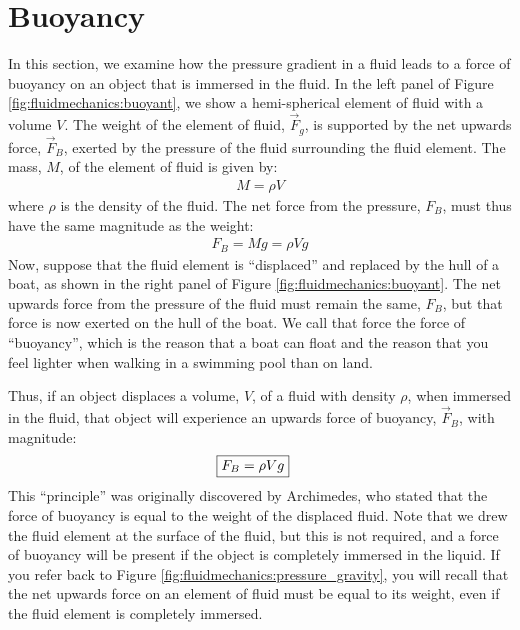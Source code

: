 {{\section{Buoyancy}
In this section, we examine how the pressure gradient in a fluid leads to a force of buoyancy on an object that is immersed in the fluid.
In the left panel of Figure \ref{fig:fluidmechanics:buoyant}, we show a hemi-spherical element of fluid with a volume $V$. The weight of the element of fluid, $\vec F_g$, is supported by the net upwards force, $\vec F_B$, exerted by the pressure of the fluid surrounding the fluid element. The mass, $M$, of the element of fluid is given by:
\begin{align*}
M = \rho V
\end{align*} 
where $\rho$ is the density of the fluid. The net force from the pressure, $F_B$, must thus have the same magnitude as the weight:
\begin{align*}
F_B = Mg = \rho V g
\end{align*}
Now, suppose that the fluid element is ``displaced'' and replaced by the hull of a boat, as shown in the right panel of Figure \ref{fig:fluidmechanics:buoyant}. The net upwards force from the pressure of the fluid must remain the same, $F_B$, but that force is now exerted on the hull of the boat. We call that force the force of ``buoyancy'', which is the reason that a boat can float and the reason that you feel lighter when walking in a swimming pool than on land. 

Thus, if an object displaces a volume, $V$, of a fluid with density $\rho$, when immersed in the fluid, that object will experience an upwards force of buoyancy, $\vec F_B$, with magnitude:
\begin{align}
\Aboxed{F_B = \rho V g}
\end{align} 
This ``principle'' was originally discovered by Archimedes, who stated that the force of buoyancy is equal to the weight of the displaced fluid. Note that we drew the fluid element at the surface of the fluid, but this is not required, and a force of buoyancy will be present if the object is completely immersed in the liquid. If you refer back to Figure \ref{fig:fluidmechanics:pressure_gravity}, you will recall that the net upwards force on an element of fluid must be equal to its weight, even if the fluid element is completely immersed.

}}

